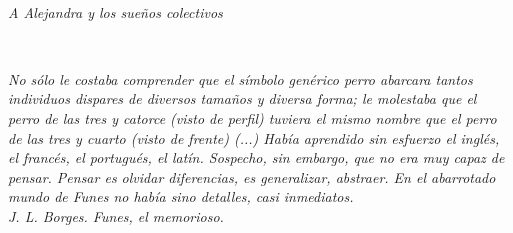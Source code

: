 
\thispagestyle{empty}

\ 

\vspace{3cm}

\begin{flushright}
\textit{A Alejandra y los sueños colectivos}
\end{flushright}

\newpage
\thispagestyle{empty}

\ 

\vspace{3cm}

\begin{flushright}
\textit{No sólo le costaba comprender que el símbolo genérico \textit{perro} abarcara tantos individuos dispares de diversos tamaños y diversa forma; le molestaba que el perro de las tres y catorce (visto de perfil) tuviera el mismo nombre que el perro de las tres y cuarto (visto de frente) (...) Había aprendido sin esfuerzo el inglés, el francés, el portugués, el latín. Sospecho, sin embargo, que no era muy capaz de pensar. Pensar es olvidar diferencias, es generalizar, abstraer. En el abarrotado mundo de Funes no había sino detalles, casi inmediatos.
\\
\medskip
J. L. Borges. Funes, el memorioso.~\cite{funes}
}
\end{flushright}